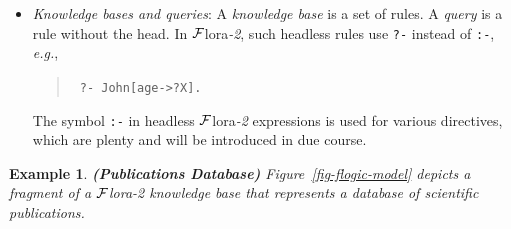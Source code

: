 \documentclass[11pt]{article}
\newcommand{\FLORA}{{\mbox{\sc ${\cal F}${lora}\rm\emph{-2}}}\xspace}
\newcommand{\FLSYSTEM}{\FLORA}
\newtheorem{example}{Example}[section]
\begin{document}
\begin{itemize}
\item \emph{Knowledge bases and queries}: A \emph{knowledge base} is a set of rules. A
  \emph{query} is a rule without the head. In \FLSYSTEM, such headless rules
  use {\tt ?-} instead of {\tt :-}, {\it e.g.}, 
  \begin{quote}
    {\tt 
   ?-~John[age->?X].    
    }
  \end{quote}
  The symbol {\tt :-} in headless \FLSYSTEM expressions is used for various
  directives, which are plenty and will be introduced in due course.
\end{itemize}



\begin{example}
  {\bf (Publications Database)} \rm Figure~\ref{fig-flogic-model} depicts
  a fragment of a \FLSYSTEM knowledge base that represents a database of scientific
  publications.
\end{example}
\end{document}
